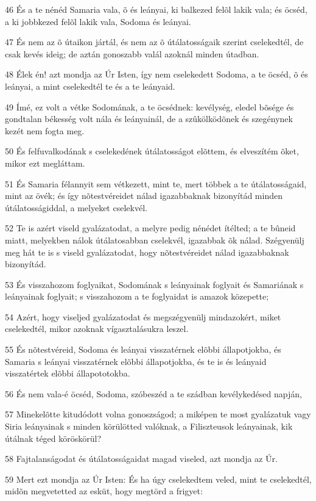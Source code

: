 \par 46 És a te nénéd Samaria vala, õ és leányai, ki balkezed felõl lakik vala; és öcséd,  a ki jobbkezed felõl lakik vala, Sodoma és leányai.
\par 47 És nem az õ útaikon jártál, és nem az õ útálatosságaik szerint cselekedtél, de csak kevés ideig; de aztán gonoszabb valál azoknál minden útadban.
\par 48 Élek én! azt mondja az Úr Isten, így nem cselekedett Sodoma, a te öcséd, õ és leányai, a mint cselekedtél te és a te leányaid.
\par 49 Ímé, ez volt a vétke Sodomának, a te öcsédnek: kevélység, eledel bõsége és gondtalan békesség volt nála és leányainál, de a szûkölködõnek és szegénynek kezét nem fogta meg.
\par 50 És felfuvalkodának s cselekedének útálatosságot elõttem, és elveszítém õket, mikor ezt megláttam.
\par 51 És Samaria félannyit sem vétkezett, mint te, mert többek a te útálatosságaid, mint az övék; és így nõtestvéreidet nálad igazabbaknak bizonyítád minden útálatosságiddal, a melyeket cselekvél.
\par 52 Te is azért viseld gyalázatodat, a melyre pedig nénédet ítélted; a te bûneid miatt, melyekben nálok útálatosabban cselekvél, igazabbak õk nálad. Szégyenülj meg hát te is s viseld gyalázatodat, hogy nõtestvéreidet nálad igazabbaknak bizonyítád.
\par 53 És visszahozom foglyaikat, Sodomának s leányainak foglyait és Samariának s leányainak foglyait; s visszahozom a te foglyaidat is amazok közepette;
\par 54 Azért, hogy viseljed gyalázatodat és megszégyenülj mindazokért, miket cselekedtél, mikor azoknak vígasztalásukra leszel.
\par 55 És nõtestvéreid, Sodoma és leányai visszatérnek elõbbi állapotjokba, és Samaria s leányai visszatérnek elõbbi állapotjokba, és te is és leányaid visszatértek elõbbi állapototokba.
\par 56 És nem vala-é öcséd, Sodoma, szóbeszéd a te szádban kevélykedésed napján,
\par 57 Minekelõtte kitudódott volna gonoszságod; a miképen te most gyalázatuk vagy Siria leányainak s minden körülötted valóknak, a Filiszteusok leányainak, kik útálnak téged köröskörül?
\par 58 Fajtalanságodat és útálatosságaidat magad viseled, azt mondja az Úr.
\par 59 Mert ezt mondja az Úr Isten: És ha úgy cselekedtem veled, mint te cselekedtél, midõn megvetetted az esküt, hogy megtörd a frigyet:
